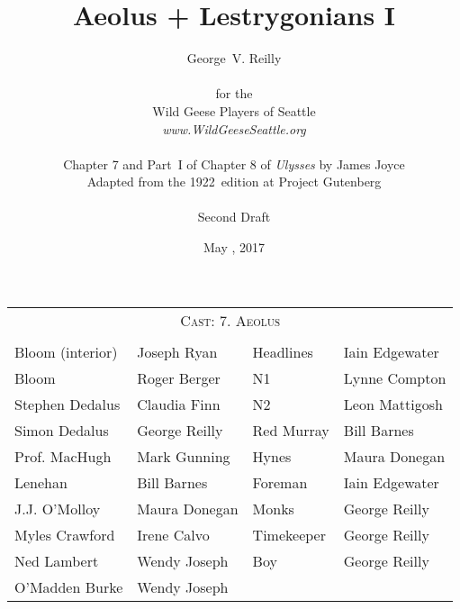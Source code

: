 



\title{\Huge Aeolus + Lestrygonians I}
\author{George~V. Reilly\\
\\
{\small for the}\\
Wild Geese Players of Seattle\\
{\emph{www.WildGeeseSeattle.org}}\\
\\
{\small Chapter 7 and Part~I of Chapter 8 of \emph{Ulysses} by James Joyce}\\
{\small Adapted from the 1922~edition at Project Gutenberg}
\\
\\
{\small Second Draft}}
\date{May , 2017}
\raggedbottom



\maketitle
\thispagestyle{empty}
\pagebreak

\begin{tabular}{l p{5cm} l p{5cm}}
    \multicolumn{4}{c}{\Large \textsc{Cast: 7. Aeolus}} \\
\\
Bloom (interior)        & Joseph Ryan           & Headlines       & Iain Edgewater \\
Bloom                   & Roger Berger          & N1              & Lynne Compton \\
Stephen Dedalus         & Claudia Finn          & N2              & Leon Mattigosh \\
Simon Dedalus           & George Reilly         & Red Murray      & Bill Barnes \\
Prof. MacHugh           & Mark Gunning          & Hynes           & Maura Donegan \\
Lenehan                 & Bill Barnes           & Foreman         & Iain Edgewater \\
J.J. O'Molloy           & Maura Donegan         & Monks           & George Reilly \\
Myles Crawford          & Irene Calvo           & Timekeeper      & George Reilly \\
Ned Lambert             & Wendy Joseph          & Boy             & George Reilly \\
O'Madden Burke          & Wendy Joseph      \\
\end{tabular}

